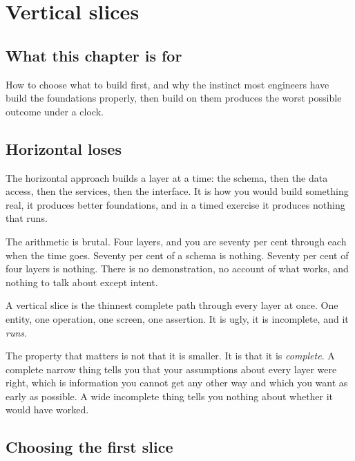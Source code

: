 \chapter{Vertical slices}
\label{ch:slices}

\section*{What this chapter is for}

How to choose what to build first, and why the instinct most engineers have
\dash{} build the foundations properly, then build on them \dash{} produces the
worst possible outcome under a clock.

\section{Horizontal loses}

The horizontal approach builds a layer at a time: the schema, then the data
access, then the services, then the interface. It is how you would build
something real, it produces better foundations, and in a timed exercise it
produces nothing that runs.

The arithmetic is brutal. Four layers, and you are seventy per cent through
each when the time goes. Seventy per cent of a schema is nothing. Seventy per
cent of four layers is nothing. There is no demonstration, no account of what
works, and nothing to talk about except intent.

A vertical slice is the thinnest complete path through every layer at once.
One entity, one operation, one screen, one assertion. It is ugly, it is
incomplete, and it \emph{runs}.

\begin{kitnote}
The property that matters is not that it is smaller. It is that it is
\emph{complete}. A complete narrow thing tells you that your assumptions about
every layer were right, which is information you cannot get any other way and
which you want as early as possible. A wide incomplete thing tells you nothing
about whether it would have worked.
\end{kitnote}

\section{Choosing the first slice}

